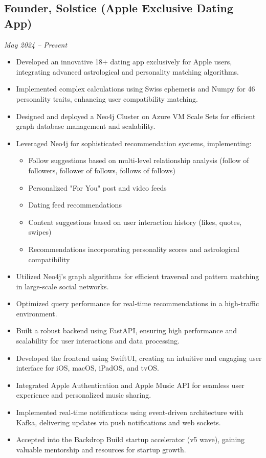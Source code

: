 \documentclass[a4paper,10pt]{article}
\begin{document}
\subsection*{Founder, Solstice (Apple Exclusive Dating App)}
\textit{May 2024 -- Present}
\begin{itemize}
    \item Developed an innovative 18+ dating app exclusively for Apple users, integrating advanced astrological and personality matching algorithms.
    \item Implemented complex calculations using Swiss ephemeris and Numpy for 46 personality traits, enhancing user compatibility matching.
    \item Designed and deployed a Neo4j Cluster on Azure VM Scale Sets for efficient graph database management and scalability.
    \item Leveraged Neo4j for sophisticated recommendation systems, implementing:
        \begin{itemize}
            \item Follow suggestions based on multi-level relationship analysis (follow of followers, follower of follows, follows of follows)
            \item Personalized "For You" post and video feeds
            \item Dating feed recommendations
            \item Content suggestions based on user interaction history (likes, quotes, swipes)
            \item Recommendations incorporating personality scores and astrological compatibility
        \end{itemize}
    \item Utilized Neo4j's graph algorithms for efficient traversal and pattern matching in large-scale social networks.
    \item Optimized query performance for real-time recommendations in a high-traffic environment.
    \item Built a robust backend using FastAPI, ensuring high performance and scalability for user interactions and data processing.
    \item Developed the frontend using SwiftUI, creating an intuitive and engaging user interface for iOS, macOS, iPadOS, and tvOS.
    \item Integrated Apple Authentication and Apple Music API for seamless user experience and personalized music sharing.
    \item Implemented real-time notifications using event-driven architecture with Kafka, delivering updates via push notifications and web sockets.
    \item Accepted into the Backdrop Build startup accelerator (v5 wave), gaining valuable mentorship and resources for startup growth.
\end{itemize}
\end{document}
